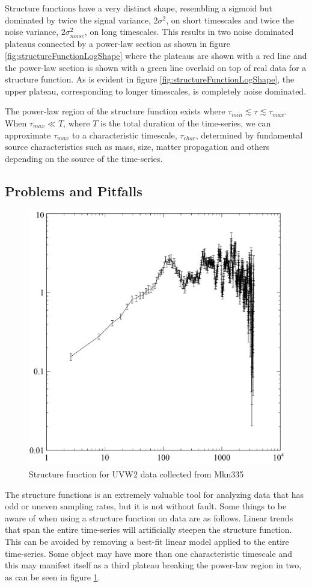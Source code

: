 \documentclass[12pt, oneside]{smuthesis}
\begin{document}
Structure functions have a very distinct shape, resembling a sigmoid but dominated by twice the signal variance, $2\sigma^{2}$, on short timescales and twice the noise variance, $2\sigma_{noise}^{2}$, on long timescales. This results in two noise dominated plateaus connected by a power-law section as shown in figure \ref{fig:structureFunctionLogShape} where the plateaus are shown with a red line and the power-law section is shown with a green line overlaid on top of real data for a structure function. As is evident in figure \ref{fig:structureFunctionLogShape}, the upper plateau, corresponding to longer timescales, is completely noise dominated.

The power-law region of the structure function exists where $\tau_{min}\lesssim\tau\lesssim\tau_{max}$. When $\tau_{max}\ll T$, where $T$ is the total duration of the time-series, we can approximate $\tau_{max}$ to a characteristic timescale, $\tau_{char}$, determined by fundamental source characteristics such as mass, size, matter propagation and others depending on the source of the time-series.

\subsection{\sc Problems and Pitfalls} \label{problemsAndPitfalls}

\begin{figure}
	\centering
	\includegraphics[width=0.4\linewidth]{mkn335UVW2SF}
	\caption{Structure function for UVW2 data collected from Mkn335}
	\label{fig:mkn335UVW2SF}
\end{figure}

The structure functions is an extremely valuable tool for analyzing data that has odd or uneven sampling rates, but it is not without fault. Some things to be aware of when using a structure function on data are as follows. Linear trends that span the entire time-series will artificially steepen the structure function. This can be avoided by removing a best-fit linear model applied to the entire time-series. Some object may have more than one characteristic timescale and this may manifest itself as a third plateau breaking the power-law region in two, as can be seen in figure \ref{fig:mkn335UVW2SF}. 
\end{document}
